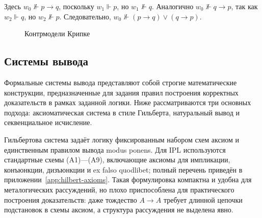 \documentclass[14pt, russian]{scrartcl}
\begin{document}
Здесь $w_0 \not\Vdash p \rightarrow q$, поскольку $w_1 \Vdash p$, но
$w_1 \not\Vdash q$. Аналогично $w_0 \not\Vdash q \rightarrow p$, так как
$w_2 \Vdash q$, но $w_2 \not\Vdash p$. Следовательно,
$w_0 \not\Vdash (p \rightarrow q) \lor (q \rightarrow p)$.

\begin{figure}[!htb]
\centering
{}\hfill
{}
\caption{Контрмодели Крипке}
\label{fig:kripke-countermodels}
\end{figure}

\subsection{Системы вывода}

Формальные системы вывода представляют собой строгие математические конструкции,
предназначенные для задания правил построения корректных доказательств в рамках
заданной логики. Ниже рассматриваются три основных подхода: аксиоматическая
система в стиле Гильберта, натуральный вывод и секвенциальное исчисление.

Гильбертова система задаёт логику фиксированным набором схем аксиом и единственным
правилом вывода modus ponens. Для IPL используются стандартные схемы (A1)---(A9),
включающие аксиомы для импликации, конъюнкции, дизъюнкции и ex falso quodlibet;
полный перечень приведён в приложении~\ref{app:hilbert-axioms}. Такая формулировка компактна и удобна для металогических рассуждений, но плохо
приспособлена для практического построения доказательств: даже тождество
$A \rightarrow A$ требует длинной цепочки подстановок в схемы аксиом, а структура
рассуждения не выделена явно.
\end{document}
